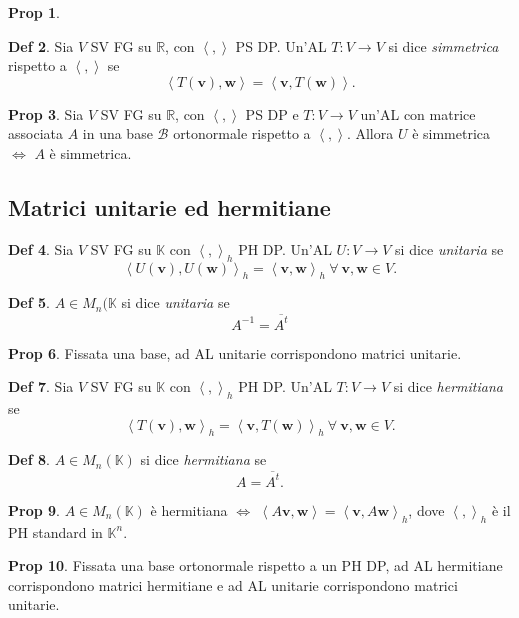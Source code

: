 \documentclass[]{article}
\newcommand{\vv}{\mathbf{v}}
\newcommand{\vw}{\mathbf{w}}
\newcommand{\scalprod}[2]{\left\langle #1 , #2 \right\rangle}
\theoremstyle{definition}
\theoremstyle{definition}
\newtheorem{prop}{Prop}[subsection]
\theoremstyle{definition}
\newtheorem{dfn}[prop]{Def}
\begin{document}
\begin{prop}
\end{prop} \begin{dfn} Sia $V$ SV FG su $\mathbb{R}$, con $\scalprod{}{}$ PS DP. Un'AL $T:V \to V$ si dice \emph{simmetrica} rispetto a $\scalprod{}{}$ se $$\scalprod{T(\vv )}{\vw}=\scalprod{\vv}{T(\vw )}.$$

\end{dfn} \begin{prop} Sia $V$ SV FG su $\mathbb{R}$, con $\scalprod{}{}$ PS DP e $T:V \to V$ un'AL con matrice associata $A$ in una base $\mathcal{B}$ ortonormale rispetto a $\scalprod{}{}$. Allora $U$ è simmetrica $\Leftrightarrow$ $A$ è simmetrica.
\end{prop}

\subsection{Matrici unitarie ed hermitiane} 

\begin{dfn} Sia $V$ SV FG su $\mathbb{K}$ con $\scalprod{}{}_h$ PH DP. Un'AL $U:V \to V$ si dice \emph{unitaria} se $$\scalprod{U(\vv )}{U(\vw )}_h = \scalprod{\vv}{\vw}_h \ \forall \ \vv , \vw \in V.$$

\end{dfn} \begin{dfn} $A \in M_n (\mathbb{K}$ si dice \emph{unitaria} se $$A^{-1}=\overline{A^t}$$

\end{dfn} \begin{prop} Fissata una base, ad AL unitarie corrispondono matrici unitarie.

\end{prop} \begin{dfn} Sia $V$ SV FG su $\mathbb{K}$ con $\scalprod{}{}_h$ PH DP. Un'AL $T:V \to V$ si dice \emph{hermitiana} se $$\scalprod{T(\vv )}{\vw}_h = \scalprod{\vv}{T(\vw )}_h \ \forall \ \vv , \vw \in V.$$

\end{dfn} \begin{dfn} $A \in M_n (\mathbb{K})$ si dice \emph{hermitiana} se $$A=\overline{A^t}.$$

\end{dfn} \begin{prop} $A \in M_n (\mathbb{K})$ è hermitiana $\Leftrightarrow$ $\scalprod{A\vv}{\vw}=\scalprod{\vv}{A\vw}_h$, dove $\scalprod{}{}_h$ è il PH standard in $\mathbb{K}^n$.

\end{prop} \begin{prop} Fissata una base ortonormale rispetto a un PH DP, ad AL hermitiane corrispondono matrici hermitiane e ad AL unitarie corrispondono matrici unitarie.
\end{prop}
\end{document}

